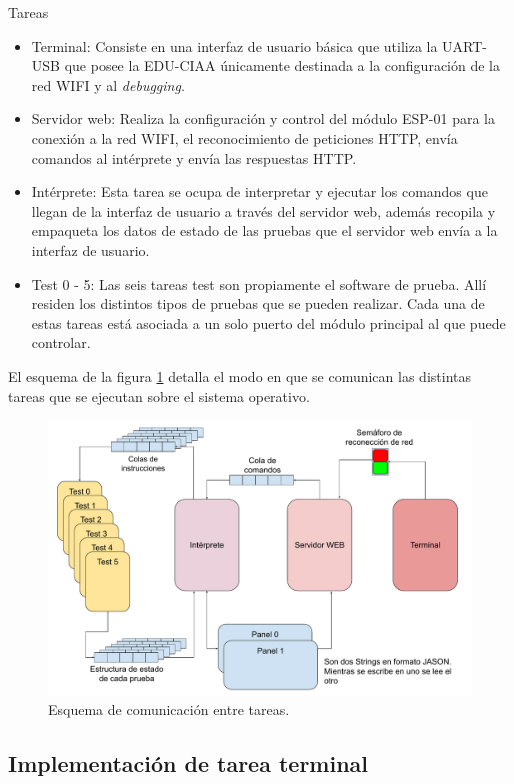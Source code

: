 Tareas
\begin{itemize}
	\item Terminal: Consiste en una interfaz de usuario básica que utiliza la UART-USB que posee la EDU-CIAA únicamente destinada a la configuración de la red WIFI y al \textit{debugging}.
	\item Servidor web: Realiza la configuración y control del módulo ESP-01 para la conexión a la red WIFI, el reconocimiento de peticiones HTTP, envía comandos al intérprete y envía las respuestas HTTP. 
	\item Intérprete: Esta tarea se ocupa de interpretar y ejecutar los comandos que llegan de la interfaz de usuario a través del servidor web, además recopila y empaqueta los datos de estado de las pruebas que el servidor web envía a la interfaz de usuario.
	\item Test 0 - 5: Las seis tareas test son propiamente el software de prueba. Allí residen los distintos tipos de pruebas que se pueden realizar. Cada una de estas tareas está asociada a un solo puerto del módulo principal al que puede controlar.
\end{itemize}	
	
El esquema de la figura \ref{fig:ComuTareas} detalla el modo en que se comunican las distintas tareas que se ejecutan sobre el sistema operativo.

\begin{figure}[H]
	\centering
	\includegraphics[width=1\textwidth]{./Figures/ComuTareas.pdf}
	\caption{Esquema de comunicación entre tareas.}
	\label{fig:ComuTareas}
\end{figure}



\subsection{Implementación de tarea terminal}

